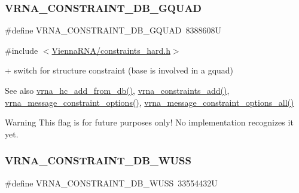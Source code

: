 \subsubsection{\texorpdfstring{V\+R\+N\+A\+\_\+\+C\+O\+N\+S\+T\+R\+A\+I\+N\+T\+\_\+\+D\+B\+\_\+\+G\+Q\+U\+AD}{VRNA\_CONSTRAINT\_DB\_GQUAD}}
{\footnotesize\ttfamily \#define V\+R\+N\+A\+\_\+\+C\+O\+N\+S\+T\+R\+A\+I\+N\+T\+\_\+\+D\+B\+\_\+\+G\+Q\+U\+AD~8388608U}



{\ttfamily \#include $<$\hyperlink{constraints__hard_8h}{Vienna\+R\+N\+A/constraints\+\_\+hard.\+h}$>$}



\textquotesingle{}+\textquotesingle{} switch for structure constraint (base is involved in a gquad) 

\begin{DoxySeeAlso}{See also}
\hyperlink{group__hard__constraints_ga5b4de3247b67358080c176b94591a8e6}{vrna\+\_\+hc\+\_\+add\+\_\+from\+\_\+db()}, \hyperlink{group__constraints_ga35a401f680969a556858a8dd5f1d07cc}{vrna\+\_\+constraints\+\_\+add()}, \hyperlink{group__constraints_gaa1f20b53bf09ac2e6b0dbb13f7d89670}{vrna\+\_\+message\+\_\+constraint\+\_\+options()}, \hyperlink{group__constraints_gaec7e13fa0465c2acc7a621d1aecb709f}{vrna\+\_\+message\+\_\+constraint\+\_\+options\+\_\+all()}
\end{DoxySeeAlso}
\begin{DoxyWarning}{Warning}
This flag is for future purposes only! No implementation recognizes it yet. 
\end{DoxyWarning}
\mbox{\label{group__hard__constraints_ga10ce6bd2355945f3c8161b7a30a2c322}} 
\subsubsection{\texorpdfstring{V\+R\+N\+A\+\_\+\+C\+O\+N\+S\+T\+R\+A\+I\+N\+T\+\_\+\+D\+B\+\_\+\+W\+U\+SS}{VRNA\_CONSTRAINT\_DB\_WUSS}}
{\footnotesize\ttfamily \#define V\+R\+N\+A\+\_\+\+C\+O\+N\+S\+T\+R\+A\+I\+N\+T\+\_\+\+D\+B\+\_\+\+W\+U\+SS~33554432U}



